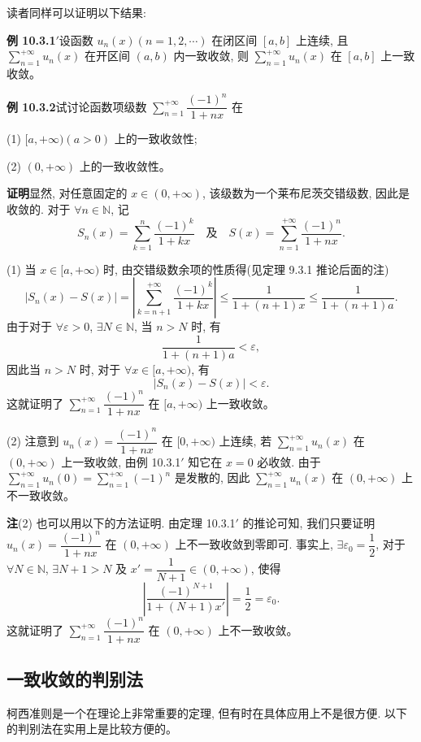 \documentclass[UTF8,12pt,a4paper,fontset=fandol]{ctexart}
\begin{document}
读者同样可以证明以下结果:

\noindent\textbf{例 10.3.1$'$}\quad 设函数 $u_n(x)(n=1,2,\cdots)$ 在闭区间 $[a,b]$ 上连续, 且 $\sum\limits_{n=1}^{+\infty}u_n(x)$ 在开区间 $(a,b)$ 内一致收敛, 则 $\sum\limits_{n=1}^{+\infty}u_n(x)$ 在 $[a,b]$ 上一致收敛。

\noindent\textbf{例 10.3.2}\quad 试讨论函数项级数 $\sum\limits_{n=1}^{+\infty}\dfrac{(-1)^n}{1+nx}$ 在

(1) $[a,+\infty)(a>0)$ 上的一致收敛性;

(2) $(0,+\infty)$ 上的一致收敛性。

\noindent\textbf{证明}\quad 显然, 对任意固定的 $x\in(0,+\infty)$, 该级数为一个莱布尼茨交错级数, 因此是收敛的. 对于 $\forall n\in\mathbb N$, 记
\[
  S_n(x)=\sum_{k=1}^n\frac{(-1)^k}{1+kx}\quad\text{及}\quad S(x)=\sum_{n=1}^{+\infty}\frac{(-1)^n}{1+nx}.
\]

(1) 当 $x\in[a,+\infty)$ 时, 由交错级数余项的性质得(见定理 9.3.1 推论后面的注)
\[
  |S_n(x)-S(x)|=\left|\sum_{k=n+1}^{+\infty}\frac{(-1)^k}{1+kx}\right|\leq\frac1{1+(n+1)x}\leq\frac1{1+(n+1)a}.
\]
由于对于 $\forall\varepsilon>0$, $\exists N\in\mathbb N$, 当 $n>N$ 时, 有
\[
  \frac1{1+(n+1)a}<\varepsilon,
\]
因此当 $n>N$ 时, 对于 $\forall x\in[a,+\infty)$, 有
\[
  |S_n(x)-S(x)|<\varepsilon.
\]
这就证明了 $\sum\limits_{n=1}^{+\infty}\dfrac{(-1)^n}{1+nx}$ 在 $[a,+\infty)$ 上一致收敛。

(2) 注意到 $u_n(x)=\dfrac{(-1)^n}{1+nx}$ 在 $[0,+\infty)$ 上连续, 若 $\sum\limits_{n=1}^{+\infty}u_n(x)$ 在 $(0,+\infty)$ 上一致收敛, 由例 10.3.1$'$ 知它在 $x=0$ 必收敛. 由于 $\sum\limits_{n=1}^{+\infty}u_n(0)=\sum\limits_{n=1}^{+\infty}(-1)^n$ 是发散的, 因此 $\sum\limits_{n=1}^{+\infty}u_n(x)$ 在 $(0,+\infty)$ 上不一致收敛。

\noindent\textbf{注}\quad (2) 也可以用以下的方法证明. 由定理 10.3.1$'$ 的推论可知, 我们只要证明 $u_n(x)=\dfrac{(-1)^n}{1+nx}$ 在 $(0,+\infty)$ 上不一致收敛到零即可. 事实上, $\exists\varepsilon_0=\dfrac12$, 对于 $\forall N\in\mathbb N$, $\exists N+1>N$ 及 $x'=\dfrac1{N+1}\in(0,+\infty)$, 使得
\[
  \left|\frac{(-1)^{N+1}}{1+(N+1)x'}\right|=\frac12=\varepsilon_0.
\]
这就证明了 $\sum\limits_{n=1}^{+\infty}\dfrac{(-1)^n}{1+nx}$ 在 $(0,+\infty)$ 上不一致收敛。

\subsection{一致收敛的判别法}

柯西准则是一个在理论上非常重要的定理, 但有时在具体应用上不是很方便. 以下的判别法在实用上是比较方便的。
\end{document}

